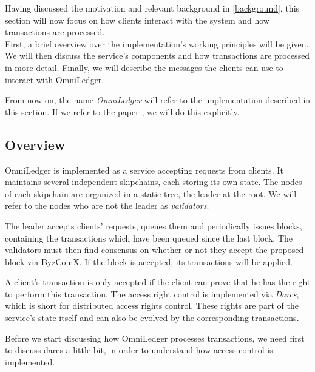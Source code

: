 \documentclass[11pt, a4paper, twoside, openright]{article} %
\begin{document}
Having discussed the motivation and relevant background in \ref{background},
this section will now focus on how clients interact with the system
and how transactions are processed.\\

First, a brief overview over the implementation's working principles will be
given.  We will then discuss the service's components and how transactions are
processed in more detail.
Finally, we will describe the messages the clients can use to interact with
OmniLedger.

From now on, the name \textit{OmniLedger} will refer to the implementation
described in this section. If we refer to the paper
\cite{KokorisKogias2017OmniLedgerAS}, we will do this explicitly.


\subsection{Overview} \label{overview}
OmniLedger is implemented as a service accepting requests from clients.
It maintains several independent skipchains, each storing its own state.
The nodes of each skipchain are organized in a static tree, the leader at the
root. We will refer to the nodes who are not the leader as \textit{validators}.

The leader accepts clients' requests, queues them and periodically issues
blocks, containing the transactions which have been queued since the last
block.
The validators must then find consensus on whether or not they accept the
proposed block via ByzCoinX. If the block is accepted, its transactions will be
applied.

A client's transaction is only accepted if the client can prove that he has the
right to perform this transaction.
The access right control is implemented via \textit{Darcs}, which
is short for distributed access rights control.
These rights are part of the service's state itself and can also be evolved by
the corresponding transactions.

Before we start discussing how OmniLedger processes transactions, we need first
to discuss darcs a little bit, in order to understand how access control is
implemented.\\
\end{document}

